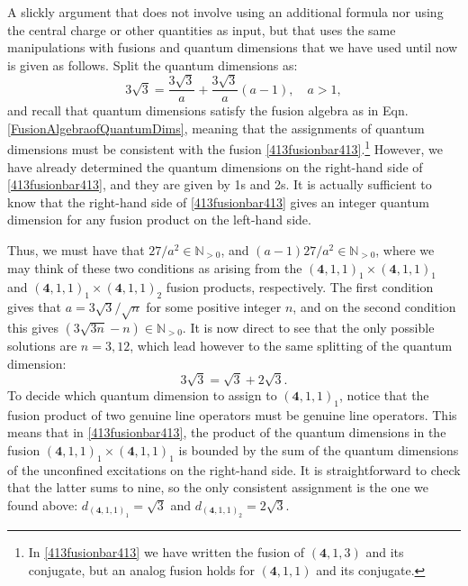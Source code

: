 \documentclass[11pt]{article}
\numberwithin{equation}{section}
\begin{document}
A slickly argument that does not involve using an additional formula nor using the central charge or other quantities as input, but that uses the same manipulations with fusions and quantum dimensions that we have used until now is given as follows. Split the quantum dimensions as:
\begin{equation}
    3\sqrt{3} = \frac{3\sqrt{3}}{a} + \frac{3\sqrt{3}}{a}(a-1), \quad a>1,
\end{equation}
and recall that quantum dimensions satisfy the fusion algebra as in Eqn. \eqref{FusionAlgebraofQuantumDims}, meaning that the assignments of quantum dimensions must be consistent with the fusion \eqref{413fusionbar413}.\footnote{In \eqref{413fusionbar413} we have written the fusion of $(\mathbf{4},1,3)$ and its conjugate, but an analog fusion holds for $(\mathbf{4},1,1)$ and its conjugate.} However, we have already determined the quantum dimensions on the right-hand side of \eqref{413fusionbar413}, and they are given by 1s and 2s. It is actually sufficient to know that the right-hand side of \eqref{413fusionbar413} gives an integer quantum dimension for any fusion product on the left-hand side.

Thus, we must have that $27/a^{2} \in \mathbb{N}_{>0}$, and $(a-1)27/a^{2} \in \mathbb{N}_{>0}$, where we may think of these two conditions as arising from the $(\mathbf{4},1,1)_{1} \times (\mathbf{4},1,1)_{1}$ and $(\mathbf{4},1,1)_{1} \times (\mathbf{4},1,1)_{2}$ fusion products, respectively. The first condition gives that $a=3\sqrt{3}/\sqrt{n}$ for some positive integer $n$, and on the second condition this gives $(3\sqrt{3n}-n) \in \mathbb{N}_{>0}$. It is now direct to see that the only possible solutions are $n = 3, 12$, which lead however to the same splitting of the quantum dimension:
\begin{equation}
    3\sqrt{3} = \sqrt{3} + 2\sqrt{3}.
\end{equation}
To decide which quantum dimension to assign to $(\mathbf{4},1,1)_{1}$, notice that the fusion product of two genuine line operators must be genuine line operators. This means that in \eqref{413fusionbar413}, the product of the quantum dimensions in the fusion $(\mathbf{4},1,1)_{1} \times (\mathbf{4},1,1)_{1}$ is bounded by the sum of the quantum dimensions of the unconfined excitations on the right-hand side. It is straightforward to check that the latter sums to nine, so the only consistent assignment is the one we found above: $d_{(\mathbf{4},1,1)_{1}} = \sqrt{3}$ and $d_{(\mathbf{4},1,1)_{2}} = 2\sqrt{3}$.
\end{document}
